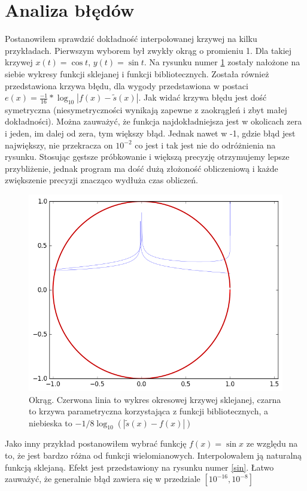 \documentclass{article}
\begin{document}
\section{Analiza błędów} 

Postanowiłem sprawdzić dokładność interpolowanej krzywej na kilku przykładach.
Pierwszym wyborem był zwykły okrąg o promieniu 1. Dla takiej krzywej $x(t)=\cos t$, $y(t)=\sin t$.
Na rysunku numer \ref{okr} zostały nałożone na siebie wykresy funkcji sklejanej i funkcji bibliotecznych. Została również przedstawiona krzywa błędu, dla wygody przedstawiona w postaci $e(x)=\frac{-1}{16}*\log_{10}|f(x)-\tilde{s}(x)|$.
Jak widać krzywa błędu jest dość symetryczna (niesymetryczności wynikają zapewne z zaokrągleń i zbyt małej dokładności). Można zauważyć, że funkcja najdokładniejsza jest w okolicach zera i jeden, im dalej od zera, tym większy błąd. Jednak nawet w -1, gdzie błąd jest największy, nie przekracza on $10^{-2}$ co jest i tak jest nie do odróżnienia na rysunku. Stosując gęstsze próbkowanie i większą precyzję otrzymujemy lepsze przybliżenie, jednak program ma dość dużą złożoność obliczeniową i każde zwiększenie precyzji znacząco wydłuża czas obliczeń.
\begin{figure}[H]
    \centering
	\includegraphics[width= 0.5 \textwidth]{okrag.png}
    \caption{Okrąg. Czerwona linia to wykres okresowej krzywej sklejanej, czarna to krzywa parametryczna korzystająca z funkcji bibliotecznych, a niebieska to $-1/8 \log_{10}(|\tilde{s}(x)-f(x)|) $ }
 	\label{okr}
\end{figure}

Jako inny przykład postanowiłem wybrać funkcję $f(x)=\sin x$ ze względu na to, że jest bardzo różna od funkcji wielomianowych. Interpolowałem ją naturalną funkcją sklejaną.
Efekt jest przedstawiony na rysunku numer \ref{sin}. Łatwo zauważyć, że generalnie błąd zawiera się w przedziale $[10^{-16},10^{-8}]$
\end{document}

